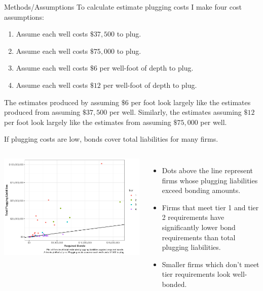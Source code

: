 \documentclass{beamer}
\begin{document}
\begin{frame}{Methods/Assumptions}
\label{costcalc}
    To calculate estimate plugging costs I make four cost assumptions:
    \begin{enumerate}
        \item Assume each well costs $\$37,500$ to plug.
        \item Assume each well costs $\$75,000$ to plug.
        \item Assume each well costs $\$6$ per well-foot of depth to plug.
        \item Assume each well costs $\$12$ per well-foot of depth to plug.
    \end{enumerate}
    \vspace{.7cm}
    The estimates produced by assuming $\$6$ per foot look largely like the estimates produced from assuming $\$37,500$ per well.  Similarly, the estimates assuming $\$12$ per foot look largely like the estimates from assuming $\$75,000$ per well.

    \hyperlink{depths}{}
\end{frame}

\begin{frame}{If plugging costs are low, bonds cover total liabilities for many firms.}
\label{Fig1}
\begin{columns}
             \centering
             \includegraphics[width=1.08\textwidth]{Figures/BondsLiabilities1.jpg}
              \begin{itemize}
                  \item Dots above the line represent firms whose plugging liabilities exceed bonding amounts.
                  \item Firms that meet tier 1 and tier 2 requirements have significantly lower bond requirements than total plugging liabilities.
                  \item Smaller firms which don't meet tier requirements look well-bonded.
              \end{itemize}
\end{columns} 
\vspace{1cm}
\hyperlink{Liability1Zoom}{}
\end{frame}
\end{document}
